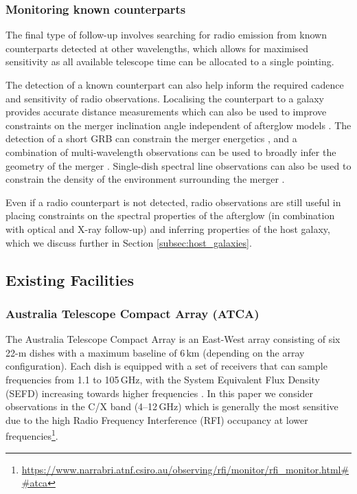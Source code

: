 \subsubsection{Monitoring known counterparts}
The final type of follow-up involves searching for radio emission from known counterparts detected at other wavelengths, which allows for maximised sensitivity as all available telescope time can be allocated to a single pointing.

The detection of a known counterpart can also help inform the required cadence and sensitivity of radio observations. Localising the counterpart to a galaxy provides accurate distance measurements \citep{2017ApJ...848L..31H} which can also be used to improve constraints on the merger inclination angle independent of afterglow models \citep{2018ApJ...853L..12M}. The detection of a short GRB can constrain the merger energetics \citep{2017ApJ...848L..13A,2017ApJ...848L..14G}, and a combination of multi-wavelength observations can be used to broadly infer the geometry of the merger \citep{2017Sci...358.1559K}. Single-dish spectral line observations can also be used to constrain the density of the environment surrounding the merger \citep{2017Sci...358.1579H}. 

Even if a radio counterpart is not detected, radio observations are still useful in placing constraints on the spectral properties of the afterglow (in combination with optical and X-ray follow-up) and inferring properties of the host galaxy, which we discuss further in Section \ref{subsec:host_galaxies}.

\subsection{Existing Facilities}
\label{subsec:existing_facilities}
\subsubsection{Australia Telescope Compact Array (ATCA)}
\label{subsubsec:atca_descrip}
The Australia Telescope Compact Array is an East-West array consisting of six 22-m dishes with a maximum baseline of 6\,km (depending on the array configuration). Each dish is equipped with a set of receivers that can sample frequencies from 1.1 to 105\,GHz, with the System Equivalent Flux Density (SEFD) increasing towards higher frequencies \citep{2011MNRAS.416..832W}. In this paper we consider observations in the C/X band (4--12\,GHz) which is generally the most sensitive due to the high Radio Frequency Interference (RFI) occupancy at lower frequencies\footnote{\url{https://www.narrabri.atnf.csiro.au/observing/rfi/monitor/rfi_monitor.html##atca}}.

